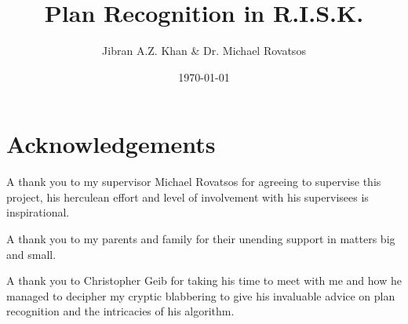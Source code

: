 \documentclass[parskip]{cs4rep}
\begin{document}
\title{Plan Recognition in R.I.S.K.}

\author{Jibran A.Z. Khan \& Dr. Michael Rovatsos}



\date{\today}

\maketitle


\section*{Acknowledgements}

A thank you to my supervisor Michael Rovatsos for agreeing to supervise this project, his herculean effort and level of involvement with his supervisees is inspirational.

A thank you to my parents and family for their unending support in matters big and small. 

A thank you to Christopher Geib for taking his time to meet with me and how he managed to decipher my cryptic blabbering to give his invaluable advice on plan recognition and the intricacies of his algorithm. 
\end{document}

